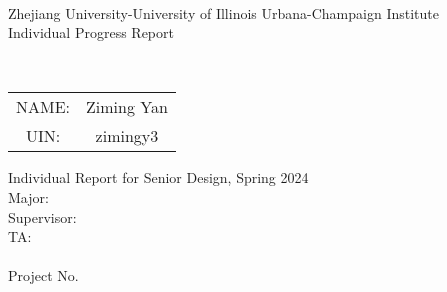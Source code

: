 \documentclass{senior-design-individual}
\begin{document}
\begin{titlepage}
    \begin{center}
        ~~\\ %
        \vspace{1.5cm}
        {\fontsize{16}{24}\selectfont Zhejiang University-University of Illinois Urbana-Champaign Institute}\\
        \vspace{1.88cm}
        {\fontsize{28}{42}\selectfont Individual Progress Report}\\
        \vspace{1.6cm}
        \begin{minipage}{15.92cm}
            \centering
            \fontsize{26}{26}\selectfont
            \MakeUppercase{\bf \RPTTITLE}
        \end{minipage}\\[2cm]
        \begin{table}[h]
            \centering
            \fontsize{14}{12}\selectfont
            \renewcommand{\arraystretch}{1.5}
            \begin{tabular}{cc}
                NAME:&Ziming Yan\\
                UIN:&zimingy3\\
            \end{tabular}
        \end{table}
        \vfill
        {\fontsize{12}{\baselineskip}\selectfont Individual Report for Senior Design, Spring 2024\\
            Major: \MAJOR \\
            Supervisor: \FACULTYNAME \\
            TA:~ \TANAME\\
            \vfill}
        {\fontsize{12}{18}\selectfont\RPTDATE\\
            Project No. \PROJNBR}
    \end{center}
    \vspace{2cm}
    ~
    \restoregeometry
\end{titlepage}
% 
% 
% 
% 
\tableofcontents
\mainmatter
\end{document}
